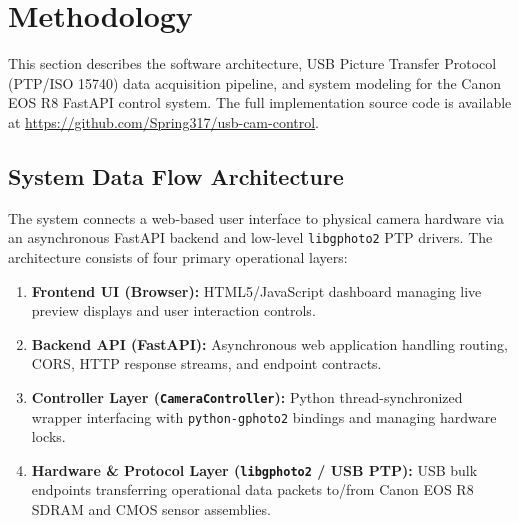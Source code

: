 \documentclass[12pt,a4paper]{article}
\begin{document}
\section{Methodology}

This section describes the software architecture, USB Picture Transfer Protocol (PTP/ISO 15740) data acquisition pipeline, and system modeling for the Canon EOS R8 FastAPI control system. The full implementation source code is available at \url{https://github.com/Spring317/usb-cam-control}.

\subsection{System Data Flow Architecture}

The system connects a web-based user interface to physical camera hardware via an asynchronous FastAPI backend and low-level \texttt{libgphoto2} PTP drivers. The architecture consists of four primary operational layers:

\begin{enumerate}[label=\arabic*.]
    \item \textbf{Frontend UI (Browser):} HTML5/JavaScript dashboard managing live preview displays and user interaction controls.
    \item \textbf{Backend API (FastAPI):} Asynchronous web application handling routing, CORS, HTTP response streams, and endpoint contracts.
    \item \textbf{Controller Layer (\texttt{CameraController}):} Python thread-synchronized wrapper interfacing with \texttt{python-gphoto2} bindings and managing hardware locks.
    \item \textbf{Hardware \& Protocol Layer (\texttt{libgphoto2} / USB PTP):} USB bulk endpoints transferring operational data packets to/from Canon EOS R8 SDRAM and CMOS sensor assemblies.
\end{enumerate}
\end{document}
